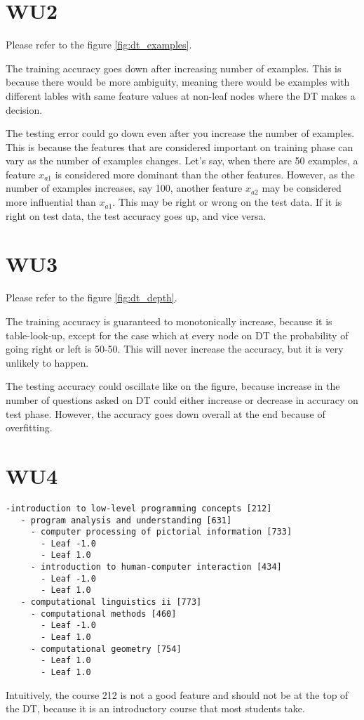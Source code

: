 \section*{WU2}
Please refer to the figure \ref{fig:dt_examples}.

The training accuracy goes down after increasing number of examples. This is because there would be more ambiguity, meaning there would be examples with different lables with same feature values at non-leaf nodes where the DT makes a decision.

The testing error could go down even after you increase the number of examples. This is because the features that are considered important on training phase can vary as the number of examples changes. Let's say, when there are 50 examples, a feature $x_{a1}$ is considered more dominant than the other features. However, as the number of examples increases, say 100, another feature $x_{a2}$ may be considered more influential than $x_{a1}$. This may be right or wrong on the test data. If it is right on test data, the test accuracy goes up, and vice versa.

\section*{WU3}
Please refer to the figure \ref{fig:dt_depth}.

The training accuracy is guaranteed to monotonically increase, because it is table-look-up, except for the case which at every node on DT the probability of going right or left is 50-50. This will never increase the accuracy, but it is very unlikely to happen. 

The testing accuracy could oscillate like on the figure, because increase in the number of questions asked on DT could either increase or decrease in accuracy on test phase. However, the accuracy goes down overall at the end because of overfitting.

\section*{WU4}
  \begin{verbatim}
-introduction to low-level programming concepts [212]
   - program analysis and understanding [631]
     - computer processing of pictorial information [733]
       - Leaf -1.0
       - Leaf 1.0
     - introduction to human-computer interaction [434]
       - Leaf -1.0
       - Leaf 1.0
   - computational linguistics ii [773]
     - computational methods [460]
       - Leaf -1.0
       - Leaf 1.0
     - computational geometry [754]
       - Leaf 1.0
       - Leaf 1.0
  \end{verbatim}
Intuitively, the course 212 is not a good feature and should not be at the top of the DT, because it is an introductory course that most students take. 

